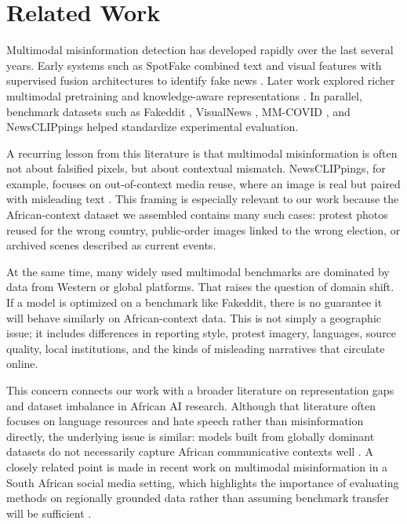 \documentclass[a4paper,10.5pt,twoside]{article}
\begin{document}
\section{Related Work}
Multimodal misinformation detection has developed rapidly over the last several years. Early systems such as SpotFake combined text and visual features with supervised fusion architectures to identify fake news \cite{khattar2020spotfake}. Later work explored richer multimodal pretraining and knowledge-aware representations \cite{li2024kamp}. In parallel, benchmark datasets such as Fakeddit \cite{nakamura2019fakeddit}, VisualNews \cite{liu2021visualnews}, MM-COVID \cite{li2020mmcovid}, and NewsCLIPpings \cite{luo2021newsclippings} helped standardize experimental evaluation.

A recurring lesson from this literature is that multimodal misinformation is often not about falsified pixels, but about contextual mismatch. NewsCLIPpings, for example, focuses on out-of-context media reuse, where an image is real but paired with misleading text \cite{luo2021newsclippings}. This framing is especially relevant to our work because the African-context dataset we assembled contains many such cases: protest photos reused for the wrong country, public-order images linked to the wrong election, or archived scenes described as current events.

At the same time, many widely used multimodal benchmarks are dominated by data from Western or global platforms. That raises the question of domain shift. If a model is optimized on a benchmark like Fakeddit, there is no guarantee it will behave similarly on African-context data. This is not simply a geographic issue; it includes differences in reporting style, protest imagery, languages, source quality, local institutions, and the kinds of misleading narratives that circulate online.

This concern connects our work with a broader literature on representation gaps and dataset imbalance in African AI research. Although that literature often focuses on language resources and hate speech rather than misinformation directly, the underlying issue is similar: models built from globally dominant datasets do not necessarily capture African communicative contexts well \cite{muhammad2025afrihate}. A closely related point is made in recent work on multimodal misinformation in a South African social media setting, which highlights the importance of evaluating methods on regionally grounded data rather than assuming benchmark transfer will be sufficient \cite{dejager2023southafrica}.
\end{document}
